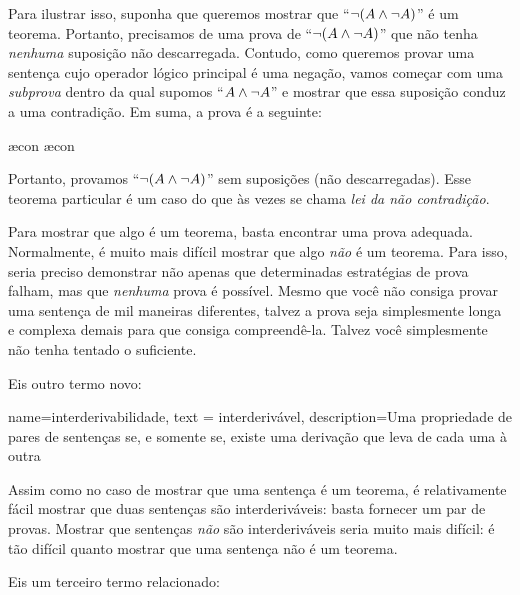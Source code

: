 Para ilustrar isso, suponha que queremos mostrar que \textquotedblleft{}$\neg (A \wedge \neg A)$\textquotedblright{} é um teorema. Portanto, precisamos de uma prova de \textquotedblleft{}$\neg(A \wedge \neg A)$\textquotedblright{} que não tenha \emph{nenhuma} suposição não descarregada. Contudo, como queremos provar uma sentença cujo operador lógico principal é uma negação, vamos começar com uma \emph{subprova} dentro da qual supomos \textquotedblleft{}$A \wedge \neg A$\textquotedblright{} e mostrar que essa suposição conduz a uma contradição. Em suma, a prova é a seguinte:
	\begin{fitchproof}
		\open
			\AS
			\ae{con}
			\ae{con}
		\close
	\end{fitchproof}
Portanto, provamos \textquotedblleft{}$\neg (A \wedge \neg A)$\textquotedblright{} sem
suposições (não descarregadas). Esse teorema particular é um caso
do que às vezes se chama \emph{lei da não contradição}.

Para mostrar que algo é um teorema, basta encontrar uma prova adequada. Normalmente, é muito mais difícil mostrar que algo \emph{não} é um teorema. Para isso, seria preciso demonstrar não apenas que determinadas estratégias de prova falham, mas que \emph{nenhuma} prova é possível. Mesmo que você não consiga provar uma sentença de mil maneiras diferentes, talvez a prova seja simplesmente longa e complexa demais para que consiga compreendê-la. Talvez você simplesmente não tenha tentado o suficiente.

Eis outro termo novo:
        
{
  name=interderivabilidade,
  text = interderiv\'avel,
description={Uma propriedade de pares de senten\c{c}as se, e somente se, existe uma deriva\c{c}\~{a}o que leva de cada uma \`a outra}
}


Assim como no caso de mostrar que uma sentença é um teorema, é relativamente fácil mostrar que duas sentenças são interderiváveis: basta fornecer um par de provas. Mostrar que sentenças \emph{não} são interderiváveis seria muito mais difícil: é tão difícil quanto mostrar que uma sentença não é um teorema.

Eis um terceiro termo relacionado:
        
